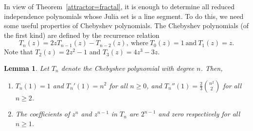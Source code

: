 \documentclass[12pt,a4paper]{article}
\theoremstyle{plain}
\newtheorem{lemma}{Lemma}
\numberwithin{equation}{section}
\begin{document}
In view of Theorem~\ref{attractor=fractal}, it is enough to determine all  reduced independence polynomials  whose Julia set is a line segment. To do this, we need some useful properties of Chebyshev polynomials. The Chebyshev polynomials (of the first kind) are defined by the recurrence relation 
\begin{equation}T_{n}(z)=2zT_{n-1}(z)-T_{n-2}(z), ~\mbox{where}~  T_0(z)=1  ~\mbox{and} ~T_1(z)=z.
\label{cheby-recurrence}\end{equation} Note that  $T_2(z)=2z^2-1$ and  $T_3(z)=4z^3-3z$.  

\begin{lemma}
	Let $T_n$ denote the Chebyshev polynomial with degree $n$. Then, 
	\begin{enumerate}[label=(\roman{*})]
	
		\item $T_n(1)=1$ and  $T_n'(1)=n^2$ for all $n \geq 0$, and $T_n''(1)=\frac{2}{3}\binom{n^2}{2}$ 
	    for all $n \geq 2$.
	  \label{atone}
% 
  	\item The coefficients of $z^n$ and $z^{n-1}$ in $T_n$ are $2^{n-1}$  and zero respectively for all \(n\geq 1\). \label{coefficients}
\end{enumerate}
	\label{derivatives}	
\end{lemma}
\end{document}
